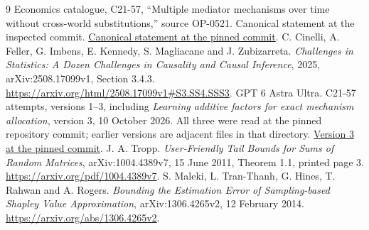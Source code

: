 \documentclass[11pt,a4paper]{article}
\numberwithin{equation}{section}
\theoremstyle{definition}
\begin{document}
\begin{thebibliography}{9}
 Economics catalogue, C21-57, ``Multiple mediator
mechanisms over time without cross-world substitutions,'' source OP-0521.
Canonical statement at the inspected commit.
\href{https://github.com/mehmetmars7/Erdosproblems-llm-hunter/blob/738965af403ff4375a58450fd971c43a817843bc/attacks/open_problems/economics/statements/C21-57.tex}{Canonical statement at the pinned commit}.
 C. Cinelli, A. Feller, G. Imbens, E. Kennedy,
S. Magliacane and J. Zubizarreta. \emph{Challenges in Statistics:
A Dozen Challenges in Causality and Causal Inference}, 2025,
arXiv:2508.17099v1, Section 3.4.3.
\url{https://arxiv.org/html/2508.17099v1#S3.SS4.SSS3}.
 GPT 6 Astra Ultra. C21-57 attempts, versions 1--3,
including \emph{Learning additive factors for exact mechanism allocation},
version 3, 10 October 2026. All three were read at the pinned repository
commit; earlier versions are adjacent files in that directory.
\href{https://github.com/mehmetmars7/Erdosproblems-llm-hunter/blob/738965af403ff4375a58450fd971c43a817843bc/attacks/open_problems/economics/gpt_6_astra_ultra/C21-57_v3.tex}{Version 3 at the pinned commit}.
 J. A. Tropp. \emph{User-Friendly Tail Bounds for Sums
of Random Matrices}, arXiv:1004.4389v7, 15 June 2011, Theorem 1.1,
printed page 3.
\url{https://arxiv.org/pdf/1004.4389v7}.
 S. Maleki, L. Tran-Thanh, G. Hines, T. Rahwan and
A. Rogers. \emph{Bounding the Estimation Error of Sampling-based
Shapley Value Approximation}, arXiv:1306.4265v2, 12 February 2014.
\url{https://arxiv.org/abs/1306.4265v2}.
\end{thebibliography}
\end{document}

